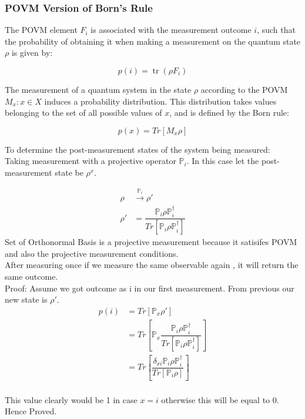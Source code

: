 \documentclass{article}
\begin{document}
\subsubsection{POVM Version of Born's Rule}
The POVM element ${\displaystyle F_{i}}$ is associated with the measurement outcome ${\displaystyle i}$, such that the probability of obtaining it when making a measurement on the quantum state ${\displaystyle \rho }$  is given by:

$${\displaystyle p(i)=\operatorname {tr} (\rho F_{i})}$$

The measurement of a quantum system in the state $\rho$ according to the POVM
$M_{x} : x \in X$ induces a probability distribution. This distribution takes values belonging to the set of all possible values of $x$, and is defined by the Born rule:

$$ p(x) = Tr[M_{x} \rho] $$

To determine the post-measurement states of the system being measured:
\\
Taking measurement with a projective operator $\mathbb{P}_{i}$.
In this case let the post-measurement state be $\rho^{x}$.


\begin{align*}
	\rho &\xrightarrow{\mathbb{P}_{i}} \rho '\\
	\rho' &= \dfrac{\mathbb{P}_{i} \rho \mathbb{P}_{i} ^ \dagger}{Tr[{\mathbb{P}_{i} \rho \mathbb{P}_{i} ^ \dagger}]}
\end{align*}
Set of Orthonormal Basis is a projective measurement because it satisifes POVM and also the projective measurement conditions.
\\
After measuring once if we measure the same observable again , it will return the same outcome.
\\
Proof:
Assume we got outcome as $\mathrm{i}$ in our first measurement. From previous our new state is $\rho '$.
\\
\begin{align*}
p(i) &= Tr \left[\mathbb{P}_{x}\rho ' \right] \\
	&= Tr \left[\mathbb{P}_{x} \dfrac{\mathbb{P}_{i} \rho \mathbb{P}_{i} ^ \dagger}{Tr\left[{\mathbb{P}_{i} \rho \mathbb{P}_{i} ^ \dagger}\right]}\right] \\
	&= Tr \left[\dfrac{\delta_{xi} \mathbb{P}_{i} \rho \mathbb{P}_{i} ^ \dagger}{Tr\left[{\mathbb{P}_{i} \rho }\right]}\right]
\end{align*}
\\
This value clearly would be 1 in case $x = i$ otherwise this will be equal to 0.
\\
Hence Proved.
\end{document}
